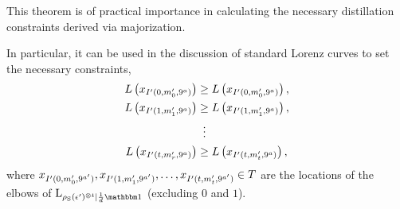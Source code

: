 This theorem is of practical importance in calculating the necessary distillation constraints derived via majorization.

In particular, it can be used in the discussion of standard Lorenz curves to set the necessary constraints,
\begin{align}
L\left(x_{\II'(0, \mlt'_{0}, 9^{\mm})}\right) &\geq L\left(x_{\II'(0, m'_{0}, 9^{\mm})}\right), \nonumber\\
L\left(x_{\II'(1, \mlt'_{1}, 9^{\mm})}\right) &\geq L\left(x_{\II'(1, m'_{1}, 9^{\mm})}\right), \nonumber\\
&\vdotswithin{=} \nonumber\\
L\left(x_{\II'(\tt, \mlt'_{r}, 9^{\mm})}\right) &\geq L\left(x_{\II'(\tt, m'_{\tt}, 9^{\mm})}\right), \nonumber
\end{align}
where $x_{I'(0, m'_{0}, 9^{a'})}, x_{I'(1, m'_{1}, 9^{a'})}, \dots, x_{I'(t, m'_{t}, 9^{a'})} \in T$ are the locations of the elbows of $\lc{\rho_{\rm{S}}(\epsilon')\too{\tt}}{\frac{1}{d}\id}$ (excluding $0$ and $1$).



